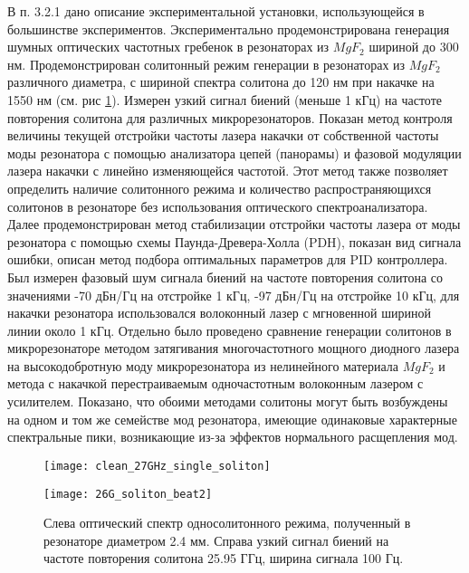 В п. 3.2.1 дано описание экспериментальной установки, использующейся в большинстве экспериментов. Экспериментально продемонстрирована генерация шумных оптических частотных гребенок в резонаторах из $MgF_2$ шириной до 300 нм. Продемонстрирован солитонный режим генерации в резонаторах из $MgF_2$ различного диаметра, с шириной спектра солитона до 120 нм при накачке на 1550 нм (см. рис \ref{clean_27GHz_single_soliton}). Измерен узкий сигнал биений (меньше 1 кГц) на частоте повторения солитона для различных микрорезонаторов. Показан метод контроля величины текущей отстройки частоты лазера накачки от собственной частоты моды резонатора с помощью анализатора цепей (панорамы) и фазовой модуляции лазера накачки с линейно изменяющейся частотой. Этот метод также позволяет определить наличие солитонного режима и количество распространяющихся солитонов в резонаторе без использования оптического спектроанализатора. Далее продемонстрирован метод стабилизации отстройки частоты лазера от моды резонатора с помощью схемы Паунда-Древера-Холла (PDH), показан вид сигнала ошибки, описан метод подбора оптимальных параметров для PID контроллера. Был измерен фазовый шум сигнала биений на частоте
повторения солитона со значениями -70 дБн/Гц на отстройке 1 кГц, -97 дБн/Гц на отстройке 10 кГц, для накачки резонатора использовался волоконный лазер с мгновенной шириной линии около 1 кГц. Отдельно было проведено сравнение генерации солитонов в микрорезонаторе методом затягивания многочастотного мощного диодного лазера на высокодобротную моду микрорезонатора из нелинейного материала $MgF_2$ и метода с накачкой перестраиваемым одночастотным волоконным лазером с усилителем. Показано, что обоими методами солитоны могут быть возбуждены на одном и том же семействе мод резонатора, имеющие одинаковые характерные спектральные пики, возникающие из-за эффектов нормального расщепления мод.

\begin{figure}[ht]
  \begin{minipage}[ht]{0.49\linewidth}\centering
    \texttt{[image: clean\_27GHz\_single\_soliton]}
  \end{minipage}
  \hfill
  \begin{minipage}[ht]{0.49\linewidth}\centering
    \texttt{[image: 26G\_soliton\_beat2]}
  \end{minipage}
  \caption{Слева оптический спектр односолитонного режима, полученный в резонаторе диаметром 2.4 мм. Справа узкий сигнал биений на частоте повторения солитона 25.95 ГГц, ширина сигнала 100 Гц.}
  \label{clean_27GHz_single_soliton}
\end{figure}

